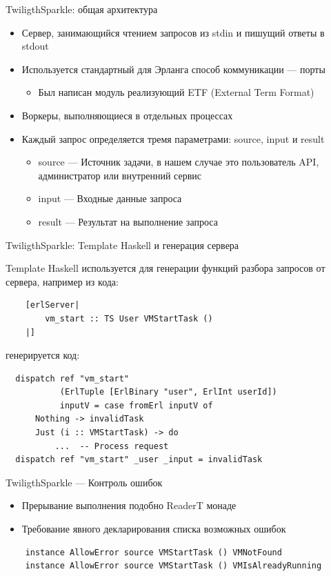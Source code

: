 \documentclass[10pt]{beamer}
\begin{document}
\begin{frame}{TwiligthSparkle: общая архитектура}
\begin{itemize}
  \item<1-> Сервер, занимающийся чтением запросов из stdin и пишущий ответы
  в stdout
  \item<1-> Используется стандартный для Эрланга способ коммуникации — порты
  \begin{itemize}
    \item Был написан модуль реализующий ETF (External Term Format)
  \end{itemize}
  \item<2-> Воркеры, выполняющиеся в отдельных процессах
  \item<3-> Каждый запрос определяется тремя параметрами: source, input и result
  \begin{itemize}
    \item source — Источник задачи, в нашем случае это пользователь API,
    администратор или внутренний сервис
    \item input — Входные данные запроса
    \item result — Результат на выполнение запроса
  \end{itemize}
\end{itemize}
\end{frame}

\begin{frame}[fragile]{TwiligthSparkle: Template Haskell и генерация сервера}

  Template Haskell используется для генерации функций разбора запросов
  от сервера, например из кода:

  \begin{verbatim}
    [erlServer|
        vm_start :: TS User VMStartTask ()
    |]
  \end{verbatim}

генерируется код:

  \begin{verbatim}
  dispatch ref "vm_start"
           (ErlTuple [ErlBinary "user", ErlInt userId])
           inputV = case fromErl inputV of
      Nothing -> invalidTask
      Just (i :: VMStartTask) -> do
          ...  -- Process request
  dispatch ref "vm_start" _user _input = invalidTask
\end{verbatim}
\end{frame}

\begin{frame}[fragile]{TwiligthSparkle — Контроль ошибок}

  \begin{itemize}
    \item Прерывание выполнения подобно ReaderT монаде
    \item Требование явного декларирования списка возможных ошибок
  \end{itemize}
  \begin{verbatim}
    instance AllowError source VMStartTask () VMNotFound
    instance AllowError source VMStartTask () VMIsAlreadyRunning
  \end{verbatim}

\end{frame}
\end{document}
